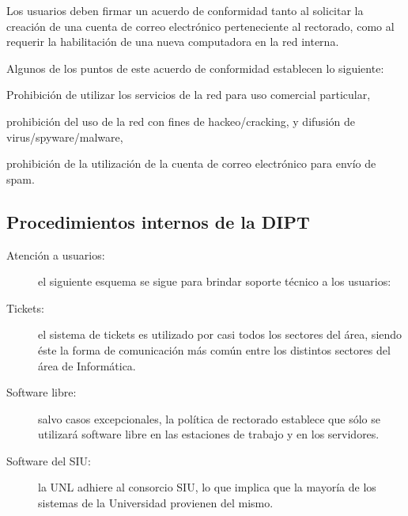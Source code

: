 \documentclass[a4paper,11pt,oneside]{article}
\begin{document}
Los usuarios deben firmar un acuerdo de conformidad tanto al solicitar
la creación de una cuenta de correo electrónico perteneciente al
rectorado, como al requerir la habilitación de una nueva computadora
en la red interna.

Algunos de los puntos de este acuerdo de conformidad establecen lo
siguiente:
%
\begin{itemize*}
\item Prohibición de utilizar los servicios de la red para uso
  comercial particular,
\item prohibición del uso de la red con fines de hackeo/cracking, y
  difusión de virus/spyware/malware,
\item prohibición de la utilización de la cuenta de correo electrónico
  para envío de spam.
\end{itemize*}
%
\subsection*{Procedimientos internos de la DIPT}
%
\begin{description}
\item[Atención a usuarios:] el siguiente esquema se sigue para brindar
  soporte técnico a los usuarios:
\item[Tickets:] el sistema de tickets es utilizado por casi todos los
  sectores del área, siendo éste la forma de comunicación más
  común entre los distintos sectores del área de Informática.
\item[Software libre:] salvo casos excepcionales, la política de
  rectorado establece que sólo se utilizará software libre en las
  estaciones de trabajo y en los servidores.
\item[Software del SIU:] la UNL adhiere al consorcio SIU, lo que
  implica que la mayoría de los sistemas de la Universidad provienen
  del mismo.
\end{description}
%
\end{document}
